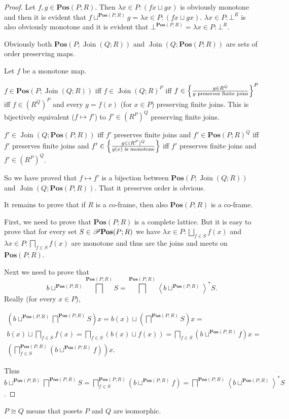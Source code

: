 \begin{proof}
Let $f,g\in\mathbf{Pos}(P;R)$. Then $\lambda x\in P:(fx\sqcup gx)$
is obviously monotone and then it is evident that $f\sqcup^{\mathbf{Pos}(P;R)}g=\lambda x\in P:(fx\sqcup gx)$.
$\lambda x\in P:\bot^{R}$ is also obviously monotone and it is evident
that $\bot^{\mathbf{Pos}(P;R)}=\lambda x\in P:\bot^{R}$.

Obviously both $\mathbf{Pos}(P;\operatorname{Join}(Q;R))$ and $\operatorname{Join}\left(Q;\mathbf{Pos}(P;R)\right)$
are sets of order preserving maps.

Let $f$ be a monotone map.

$f\in\mathbf{Pos}(P;\operatorname{Join}(Q;R))$ iff $f\in\operatorname{Join}(Q;R)^{P}$
iff $f\in\left\{ \frac{ g\in R^{Q} }{ g\text{ preserves finite joins}}\right\} ^{P}$
iff $f\in(R^{Q})^{P}$ and every $g=f(x)$ (for $x\in P$) preserving
finite joins. This is bijectively equivalent ($f\mapsto f'$) to $f'\in(R^{P})^{Q}$
preserving finite joins.

$f'\in\operatorname{Join}\left(Q;\mathbf{Pos}(P;R)\right)$ iff $f'$
preserves finite joins and $f'\in\mathbf{Pos}(P;R)^{Q}$ iff $f'$
preserves finite joins and $f'\in\left\{ \frac{g\in(R^{P})^{Q}}{g(x)\text{ is monotone}}\right\}$
iff $f'$ preserves finite joins and $f'\in(R^{P})^{Q}$.

So we have proved that $f\mapsto f'$ is a bijection between $\mathbf{Pos}(P;\operatorname{Join}(Q;R))$
and $\operatorname{Join}\left(Q;\mathbf{Pos}(P;R)\right)$. That it
preserves order is obvious.

It remains to prove that if $R$ is a co-frame, then also $\mathbf{Pos}(P;R)$
is a co-frame.

First, we need to prove that $\mathbf{Pos}(P;R)$ is a complete lattice.
But it is easy to prove that for every set $S\in\mathscr{P}\mathbf{Pos}(P;R)$
we have $\lambda x\in P:\bigsqcup_{f\in S}f(x)$ and $\lambda x\in P:\bigsqcap_{f\in S}f(x)$
are monotone and thus are the joins and meets on $\mathbf{Pos}(P;R)$.

Next we need to prove that 
\[
b\sqcup^{\mathbf{Pos}(P;R)}\bigsqcap^{\mathbf{Pos}(P;R)}S=\bigsqcap^{\mathbf{Pos}(P;R)}\left\langle b\sqcup^{\mathbf{Pos}(P;R)}\right\rangle ^{\ast}S.
\]
Really (for every $x\in P$),

\begin{multline*}
\left(b\sqcup^{\mathbf{Pos}(P;R)}\bigsqcap^{\mathbf{Pos}(P;R)}S\right)x=b(x)\sqcup\left(\bigsqcap^{\mathbf{Pos}(P;R)}S\right)x=\\
b(x)\sqcup\bigsqcap_{f\in S}f(x)=\bigsqcap_{f\in S}(b(x)\sqcup f(x))=\bigsqcap_{f\in S}\left(b\sqcup^{\mathbf{Pos}(P;R)}f\right)x=\\
\left(\bigsqcap_{f\in S}^{\mathbf{Pos}(P;R)}\left(b\sqcup^{\mathbf{Pos}(P;R)}f\right)\right)x.
\end{multline*}


Thus $b\sqcup^{\mathbf{Pos}(P;R)}\bigsqcap^{\mathbf{Pos}(P;R)}S=\bigsqcap_{f\in S}^{\mathbf{Pos}(P;R)}\left(b\sqcup^{\mathbf{Pos}(P;R)}f\right)=\bigsqcap^{\mathbf{Pos}(P;R)}\left\langle b\sqcup^{\mathbf{Pos}(P;R)}\right\rangle ^{\ast}S$.
\end{proof}
\begin{defn}
$P\cong Q$ means that posets $P$ and $Q$ are isomorphic.\end{defn}